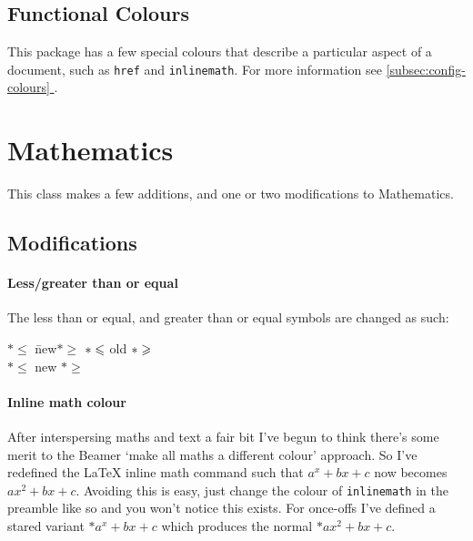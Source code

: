 \documentclass[solid,math,chem,code,plot,gloss]{bmc}
\newcommand*{\fullref}[1]{\hyperref[{#1}]{\ref*{#1} \nameref*{#1}}}
\begin{document}
\subsection{Functional Colours}
This package has a few special colours that describe a particular aspect of a document,
such as \verb|href| and \verb|inlinemath|. For more information see \fullref{subsec:config-colours}.

\section{Mathematics}

This class makes a few additions, and one or two modifications to Mathematics.

\subsection{Modifications}

\paragraph{Less/greater than or equal}
The less than or equal, and greater than or equal symbols are changed as such:
\vspace{-6pt}
\begin{center}
    \parbox{0cm}{
    \begin{tabbing}
        \(*\leq \) \quad \= new\quad \= \(*\geq \) \kill
        \(*\oldleq \) \> old \> \(*\oldgeq \) \\
        \(*\leq \) \> new \> \(*\geq \)
    \end{tabbing}}
\end{center}

\paragraph{Inline math colour}
After interspersing maths and text a fair bit I've begun to think there's some
merit to the Beamer `make all maths a different colour' approach.
So I've redefined the LaTeX inline math command such that
\texttt{\(a^x + bx + c\)} now becomes \(ax^2 + bx + c\).
Avoiding this is easy, just change the colour of \texttt{inlinemath}
in the preamble like so \texttt{}
 and you won't notice this exists.
For once-offs I've defined a stared variant \texttt{\(* a^x + bx + c\)}
which produces the normal \(*ax^2 + bx + c\).
\end{document}
